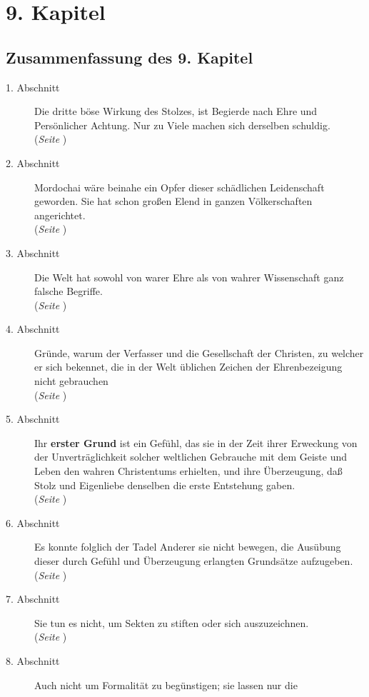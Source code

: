 
\chapter{9. Kapitel} \label{kap9}


\section{Zusammenfassung des 9. Kapitel}

\begin{description}
\item[1. Abschnitt] Die dritte böse Wirkung des Stolzes, ist Begierde nach Ehre
und Persönlicher Achtung. Nur zu Viele machen sich derselben schuldig.
\\ (\textit{Seite \pageref{kap9_ab1}})
\item[2. Abschnitt] Mordochai wäre beinahe ein Opfer dieser schädlichen
Leidenschaft geworden. Sie hat schon großen Elend in ganzen Völkerschaften
angerichtet.
\\ (\textit{Seite \pageref{kap9_ab2}})
\item[3. Abschnitt] Die Welt hat sowohl von warer Ehre als von wahrer
Wissenschaft ganz falsche Begriffe.
\\ (\textit{Seite \pageref{kap9_ab3}})
\item[4. Abschnitt] Gründe, warum der Verfasser und die Gesellschaft der
Christen, zu welcher er sich bekennet, die in der Welt üblichen Zeichen der
Ehrenbezeigung nicht gebrauchen
\\ (\textit{Seite \pageref{kap9_ab4}})
\item[5. Abschnitt] Ihr \textbf{erster Grund} ist ein Gefühl, das sie in der
Zeit ihrer
Erweckung von der Unverträglichkeit solcher weltlichen Gebrauche mit dem Geiste
und Leben den wahren Christentums erhielten, und ihre Überzeugung, daß Stolz
und Eigenliebe denselben die erste Entstehung gaben.
\\ (\textit{Seite \pageref{kap9_ab5}})
\item[6. Abschnitt] Es konnte folglich der Tadel Anderer sie nicht bewegen, die
Ausübung dieser durch Gefühl und Überzeugung erlangten Grundsätze aufzugeben.
\\ (\textit{Seite \pageref{kap9_ab6}})
\item[7. Abschnitt] Sie tun es nicht, um Sekten zu stiften oder sich
auszuzeichnen.
\\ (\textit{Seite \pageref{kap9_ab7}})
\item[8. Abschnitt] Auch nicht um Formalität zu begünstigen; sie lassen nur die

\end{description}
